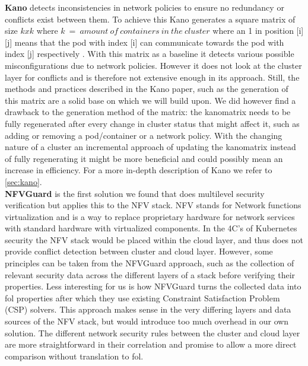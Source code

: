 \textbf{Kano} \cite{kano} detects inconsistencies in network policies to ensure no redundancy or conflicts exist between them. 
To achieve this Kano generates a square matrix of size \(kxk\) where \(k\ =\ amount\  of\  containers\  in\  the\  cluster\) where an 1 in position [i][j] means that the pod with index [i] can communicate towards the pod with index [j] respectively . With this matrix as a baseline it detects various possible misconfigurations due to network policies. However it does not look at the cluster layer for conflicts and is therefore not extensive enough in its approach. Still, the methods and practices described in the Kano paper, such as the generation of this matrix are a solid base on which we will build upon. We did however find a drawback to the generation method of the matrix: the kanomatrix needs to be fully regenerated after every change in cluster status that might affect it, such as adding or removing a pod/container or a network policy. With the changing nature of a cluster an incremental approach of updating the kanomatrix instead of fully regenerating it might be more beneficial and could possibly mean an increase in efficiency. For a more in-depth description of Kano we refer to \autoref{sec:kano}.
\\[10pt]

\textbf{NFVGuard} \cite{nfvguard} is the first solution we found that does multilevel security verification but applies this to the NFV stack. NFV stands for Network functions virtualization and is a way to replace proprietary hardware for network services with standard hardware with virtualized components. In the 4C's of Kubernetes security the NFV stack would be placed within the cloud layer, and thus does not provide conflict detection between cluster and cloud layer. However, some principles can be taken from the NFVGuard approach, such as the collection of relevant security data across the different layers of a stack before verifying their properties. Less interesting for us is how NFVGuard turns the collected data into \acrfull{fol} properties after which they use existing Constraint Satisfaction Problem (CSP) solvers. This approach makes sense in the very differing layers and data sources of the NFV stack, but would introduce too much overhead in our own solution. The different network security rules between the cluster and cloud layer are more straightforward in their correlation and promise to allow a more direct comparison without translation to \acrshort{fol}.
\\[10pt]

